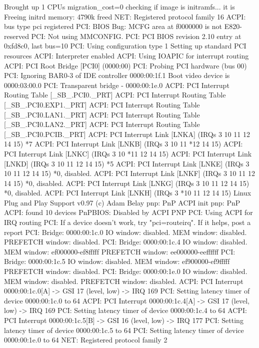 \documentclass[mingoth,a4paper]{jsarticle}
\begin{document}
\begin{commandline}
Brought up 1 CPUs
migration_cost=0
checking if image is initramfs... it is
Freeing initrd memory: 4790k freed
NET: Registered protocol family 16
ACPI: bus type pci registered
PCI: BIOS Bug: MCFG area at f0000000 is not E820-reserved
PCI: Not using MMCONFIG.
PCI: PCI BIOS revision 2.10 entry at 0xfd8c0, last bus=10
PCI: Using configuration type 1
Setting up standard PCI resources
ACPI: Interpreter enabled
ACPI: Using IOAPIC for interrupt routing
ACPI: PCI Root Bridge [PCI0] (0000:00)
PCI: Probing PCI hardware (bus 00)
PCI: Ignoring BAR0-3 of IDE controller 0000:00:1f.1
Boot video device is 0000:03:00.0
PCI: Transparent bridge - 0000:00:1e.0
ACPI: PCI Interrupt Routing Table [\_SB_.PCI0._PRT]
ACPI: PCI Interrupt Routing Table [\_SB_.PCI0.EXP1._PRT]
ACPI: PCI Interrupt Routing Table [\_SB_.PCI0.LAN1._PRT]
ACPI: PCI Interrupt Routing Table [\_SB_.PCI0.LAN2._PRT]
ACPI: PCI Interrupt Routing Table [\_SB_.PCI0.PCIB._PRT]
ACPI: PCI Interrupt Link [LNKA] (IRQs 3 10 11 12 14 15) *7
ACPI: PCI Interrupt Link [LNKB] (IRQs 3 10 11 *12 14 15)
ACPI: PCI Interrupt Link [LNKC] (IRQs 3 10 *11 12 14 15)
ACPI: PCI Interrupt Link [LNKD] (IRQs 3 10 11 12 14 15) *5
ACPI: PCI Interrupt Link [LNKE] (IRQs 3 10 11 12 14 15) *0, disabled.
ACPI: PCI Interrupt Link [LNKF] (IRQs 3 10 11 12 14 15) *0, disabled.
ACPI: PCI Interrupt Link [LNKG] (IRQs 3 10 11 12 14 15) *0, disabled.
ACPI: PCI Interrupt Link [LNKH] (IRQs 3 *10 11 12 14 15)
Linux Plug and Play Support v0.97 (c) Adam Belay
pnp: PnP ACPI init
pnp: PnP ACPI: found 10 devices
PnPBIOS: Disabled by ACPI PNP
PCI: Using ACPI for IRQ routing
PCI: If a device doesn't work, try "pci=routeirq".  If it helps, post a report
PCI: Bridge: 0000:00:1c.0
  IO window: disabled.
  MEM window: disabled.
  PREFETCH window: disabled.
PCI: Bridge: 0000:00:1c.4
  IO window: disabled.
  MEM window: ef000000-ef8fffff
  PREFETCH window: ee000000-eeffffff
PCI: Bridge: 0000:00:1c.5
  IO window: disabled.
  MEM window: ef900000-ef9fffff
  PREFETCH window: disabled.
PCI: Bridge: 0000:00:1e.0
  IO window: disabled.
  MEM window: disabled.
  PREFETCH window: disabled.
ACPI: PCI Interrupt 0000:00:1c.0[A] -> GSI 17 (level, low) -> IRQ 169
PCI: Setting latency timer of device 0000:00:1c.0 to 64
ACPI: PCI Interrupt 0000:00:1c.4[A] -> GSI 17 (level, low) -> IRQ 169
PCI: Setting latency timer of device 0000:00:1c.4 to 64
ACPI: PCI Interrupt 0000:00:1c.5[B] -> GSI 16 (level, low) -> IRQ 177
PCI: Setting latency timer of device 0000:00:1c.5 to 64
PCI: Setting latency timer of device 0000:00:1e.0 to 64
NET: Registered protocol family 2

\end{commandline}
\end{document}
